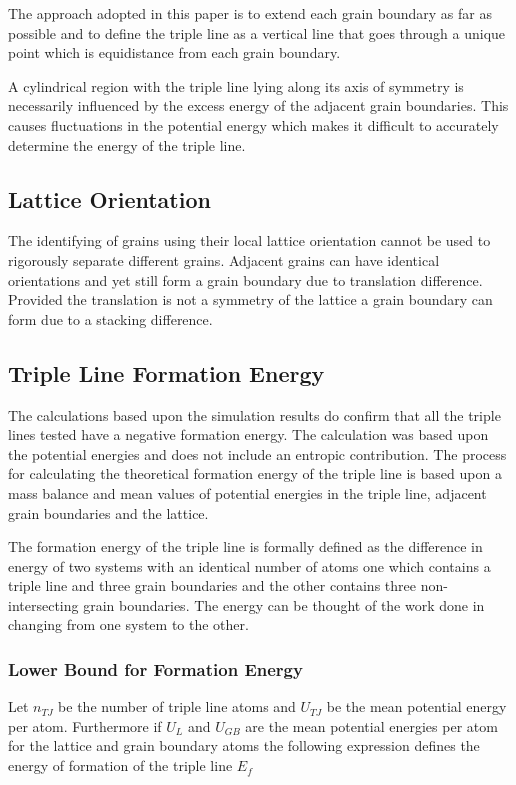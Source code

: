 \documentclass[12pt,a4paper]{book}
\begin{document}
The approach adopted in this paper is to extend each grain boundary as far as possible and to define the triple line as a vertical line that goes through a unique point which is equidistance from each grain boundary. 

A cylindrical region with the triple line lying along its axis of symmetry is necessarily influenced by the excess energy of the adjacent grain boundaries. This causes fluctuations in the potential energy which makes it difficult to accurately determine the energy of the triple line.


\subsection{Lattice Orientation}

The identifying of grains using their local lattice orientation cannot be used to rigorously separate different grains. Adjacent grains can have identical orientations and yet still form a grain boundary due to translation difference. Provided the translation is not a symmetry of the lattice a grain boundary can form due to a stacking difference.


\subsection{Triple Line Formation Energy}

The calculations based upon the simulation results do confirm that all the triple lines tested have a negative formation energy. The calculation was based upon the potential energies and does not include an entropic contribution. The process for calculating the theoretical formation energy of the triple line is based upon a mass balance and mean values of potential energies in the triple line, adjacent grain boundaries and the lattice.

The formation energy of the triple line is formally defined as the difference in energy of two systems with an identical number of atoms one which contains a triple line and three grain boundaries and the other contains three non-intersecting grain boundaries. The energy can be thought of the work done in changing from one system to the other.

\subsubsection{Lower Bound for Formation Energy}

Let $n_{TJ}$ be the number of triple line atoms and $U_{TJ}$ be the mean potential energy per atom. Furthermore if $U_{L}$ and $U_{GB}$ are the mean potential energies per atom for the lattice and grain boundary atoms the following expression defines the energy of formation of the triple line $E_{f}$
\end{document}
